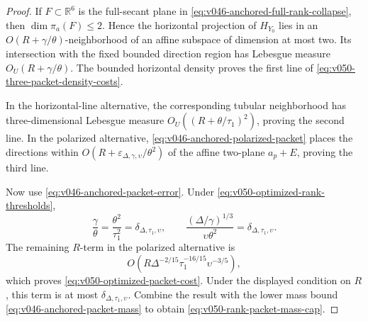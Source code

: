 \documentclass[10pt]{article}
\begin{document}
\begin{proof}
If \(F\subset\mathbb R^6\) is the full-secant plane in
\eqref{eq:v046-anchored-full-rank-collapse}, then \(\dim\pi_a(F)\le2\).  Hence the horizontal
projection of \(H_{Y_0}\) lies in an
\(O(R+\gamma/\theta)\)-neighborhood of an affine subspace of dimension at most two.  Its intersection
with the fixed bounded direction region has Lebesgue measure
\(O_U(R+\gamma/\theta)\).  The bounded horizontal density proves the first line of
\eqref{eq:v050-three-packet-density-costs}.

In the horizontal-line alternative, the corresponding tubular neighborhood has three-dimensional
Lebesgue measure \(O_U((R+\theta/\tau_1)^2)\), proving the second line.  In the polarized
alternative, \eqref{eq:v046-anchored-polarized-packet} places the directions within
\(O(R+\varepsilon_{\Delta,\gamma,\upsilon}/\theta^2)\) of the affine two-plane
\(a_p+E\), proving the third line.

Now use \eqref{eq:v046-anchored-packet-error}.  Under
\eqref{eq:v050-optimized-rank-thresholds},
\[
\frac{\gamma}{\theta}
=
\frac{\theta^2}{\tau_1^2}
=
\delta_{\Delta,\tau_1,\upsilon},
\qquad
\frac{(\Delta/\gamma)^{1/3}}{\upsilon\theta^2}
=
\delta_{\Delta,\tau_1,\upsilon}.
\]
The remaining \(R\)-term in the polarized alternative is
\[
O\!\left(
R\Delta^{-2/15}\tau_1^{-16/15}\upsilon^{-3/5}
\right),
\]
which proves \eqref{eq:v050-optimized-packet-cost}.  Under the displayed condition on \(R\), this
term is at most \(\delta_{\Delta,\tau_1,\upsilon}\).  Combine the result with the lower mass bound
\eqref{eq:v046-anchored-packet-mass} to obtain
\eqref{eq:v050-rank-packet-mass-cap}.
\end{proof}
\end{document}
